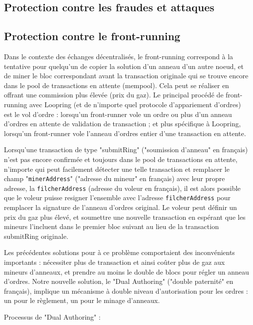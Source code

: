 \documentclass[UTF8,nofonts]{article}
\begin{document}
\begin{multicols}{2}
\section{Protection contre les fraudes et attaques}

\subsection{Protection contre le front-running\label{sec:dual_authoring}}

Dans le contexte des échanges décentralisés, le front-running correspond à la tentative pour quelqu'un de copier la solution d'un anneau d'un autre noeud, et de miner le bloc correspondant avant la transaction originale qui se trouve encore dans le pool de transactions en attente (mempool). Cela peut se réaliser en offrant une commission plus élevée (prix du gaz). Le principal procédé de front-running avec Loopring (et de n'importe quel protocole d'appariement d'ordres) est le vol d'ordre : lorsqu'un front-runner vole un ordre ou plus d'un anneau d'ordres en attente de validation de transaction ; et plus spécifique à Loopring, lorsqu'un front-runner vole l'anneau d'ordres entier d'une transaction en attente. 

Lorsqu'une transaction de type "submitRing" ("soumission d'anneau" en français) n'est pas encore confirmée et toujours dans le pool de transactions en attente, n'importe qui peut facilement détecter une telle transaction et remplacer le champ "\verb|minerAddress|" ("adresse du mineur" en français) avec leur propre adresse, la \verb|filcherAddress| (adresse du voleur en français), il est alors possible que le voleur puisse resigner l'ensemble avec l'adresse \verb|filcherAddress| pour remplacer la signature de l'anneau d'ordres original. Le voleur peut définir un prix du gaz plus élevé, et soumettre une nouvelle transaction en espérant que les mineurs l'incluent dans le premier bloc suivant au lieu de la transaction submitRing originale.

Les précédentes solutions pour à ce problème comportaient des inconvénients importants : nécessiter plus de transaction et ainsi coûter plus de gaz aux mineurs d'anneaux, et prendre au moins le double de blocs pour régler un anneau d'ordres. Notre nouvelle solution, le "Dual Authoring" \cite{dualauthor} ("double paternité" en français), implique un mécanisme à double niveau d'autorisation pour les ordres : un pour le règlement, un pour le minage d'anneaux. 

Processus de "Dual Authoring" :


\end{multicols}
\end{document}
